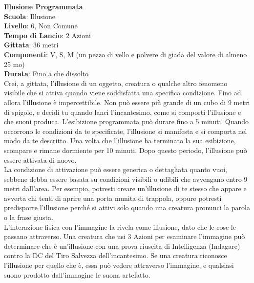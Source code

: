 \begin{multicols}{2}
\medskip\textbf{Illusione Programmata}\\
\textbf{Scuola}: Illusione\\
\textbf{Livello}: 6, Non Comune\\
\textbf{Tempo di Lancio}: 2 Azioni\\
\textbf{Gittata}: 36 metri\\
\textbf{Componenti}: V, S, M (un pezzo di vello e polvere di giada del valore di almeno 25 mo)\\
\textbf{Durata}: Fino a che dissolto\\
Crei, a gittata, l'illusione di un oggetto, creatura o qualche altro fenomeno visibile che si attiva quando viene soddisfatta una specifica condizione. Fino ad allora l'illusione è impercettibile. Non può essere più grande di un cubo di 9 metri di spigolo, e decidi tu quando lanci l'incantesimo, come si comporti l'illusione e che suoni produca. L'esibizione programmata può durare fino a 5 minuti. Quando occorrono le condizioni da te specificate, l'illusione si manifesta e si comporta nel modo da te descritto. Una volta che l'illusione ha terminato la sua esibizione, scompare e rimane dormiente per 10 minuti. Dopo questo periodo, l'illusione può essere attivata di nuovo.\\
La condizione di attivazione può essere generica o dettagliata quanto vuoi, sebbene debba essere basata su condizioni visibili o udibili che avvengano entro 9 metri dall'area. Per esempio, potresti creare un'illusione di te stesso che appare e avverta chi tenti di aprire una porta munita di trappola, oppure potresti predisporre l'illusione perché si attivi solo quando una creatura pronunci la parola o la frase giusta.\\
L'interazione fisica con l'immagine la rivela come illusione, dato che le cose le passano attraverso. Una creatura che usi 3 Azioni per esaminare l'immagine può determinare che è un'illusione con una prova riuscita di Intelligenza (Indagare) contro la DC del Tiro Salvezza dell'incantesimo. Se una creatura riconosce l'illusione per quello che è, essa può vedere attraverso l'immagine, e qualsiasi suono prodotto dall'immagine le suona artefatto.


\end{multicols}
